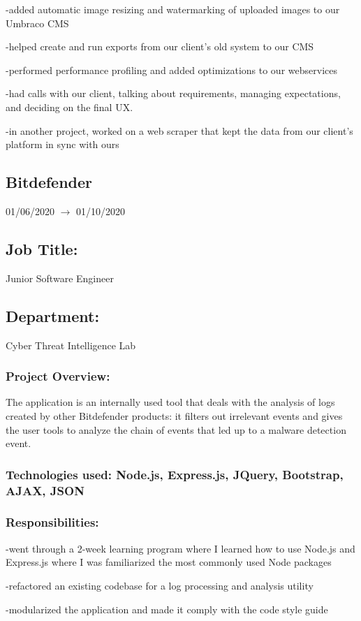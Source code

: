 \documentclass[a4paper,hidelinks,11pt]{article}
\begin{document}
-added automatic image resizing and watermarking of uploaded images to our Umbraco CMS

-helped create and run exports from our client's old system to our CMS

-performed performance profiling and added optimizations to our webservices

-had calls with our client, talking about requirements, managing expectations, and deciding on the final UX.

-in another project, worked on a web scraper that kept the data from our client's platform in sync with ours


\subsection{Bitdefender} 01/06/2020 $\rightarrow$ 01/10/2020
\subsection{Job Title:} Junior Software Engineer
\subsection{Department:} Cyber Threat Intelligence Lab
\subsubsection{Project Overview:}
The application is an internally used tool that deals with the analysis of logs created by other Bitdefender products: it filters out irrelevant events and gives the user tools to analyze the chain of events that led up to a malware detection event.
\subsubsection{Technologies used: Node.js, Express.js, JQuery, Bootstrap, AJAX, JSON}
\subsubsection{Responsibilities:}
-went through a 2-week learning program where I learned how to use Node.js and Express.js where I was familiarized the most commonly used Node packages

-refactored an existing codebase for a log processing and analysis utility

-modularized the application and made it comply with the code style guide
\end{document}
